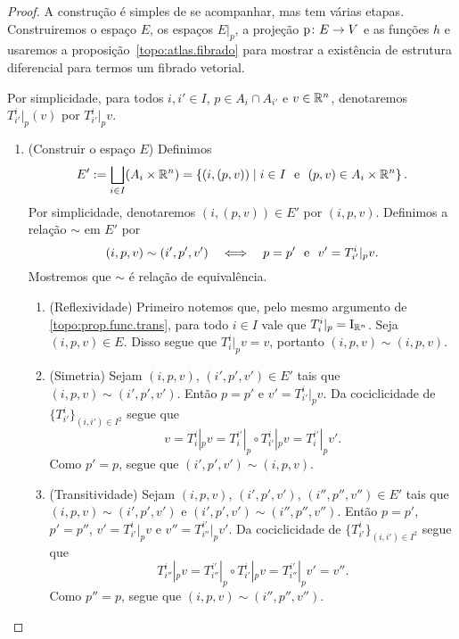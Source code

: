 \begin{proof}
A construção é simples de se acompanhar, mas tem várias etapas. Construiremos o espaço $E$, os espaços $E|_p$, a projeção $\mathrm{p}\colon E \to V$ e as funções $h$ e usaremos a proposição~\ref{topo:atlas.fibrado} para mostrar a existência de estrutura diferencial para termos um fibrado vetorial.

Por simplicidade, para todos $i,i' \in I$, $p \in A_i \cap A_{i'}$ e $v \in \mathbb{R}^n$, denotaremos $T^i_{i'}|_p (v)$ por $T^i_{i'}|_p v$.
\begin{enumerate}
\item (Construir o espaço $E$) Definimos
	\begin{equation*}
	E' := \bigsqcup_{i \in I} (A_i \times \mathbb{R}^n) = \left\{{(i,(p,v))}\;\middle\vert\;{i \in I \text{\ \ e\ \ } (p,v) \in A_i \times \mathbb{R}^n}\right\}.
	\end{equation*}
Por simplicidade, denotaremos $(i,(p,v)) \in E'$ por $(i,p,v)$. Definimos a relação $\sim$ em $E'$ por
	\begin{equation*}
	(i,p,v) \sim (i',p',v') \quad \Longleftrightarrow \quad p=p' \text{\ \ e\ \ } v'=T^i_{i'}|_p v.
	\end{equation*}
Mostremos que $\sim$ é relação de equivalência.

	\begin{enumerate}
	\item (Reflexividade) Primeiro notemos que, pelo mesmo argumento de \ref{topo:prop.func.trans}, para todo $i \in I$ vale que $T^i_i|_p = \mathrm{I}_{\mathbb{R}^n}$. Seja $(i,p,v) \in E$. %
Disso segue que $T^i_i|_p v = v$, portanto $(i,p,v) \sim (i,p,v)$.

	\item (Simetria) Sejam $(i,p,v)$, $(i',p',v') \in E'$ tais que $(i,p,v) \sim (i',p',v')$. Então $p=p'$ e $v'=T^i_{i'}|_p v$. Da %
cociclicidade de $\{T^i_{i'}\}_{(i,i') \in I^2}$ segue que
	\begin{equation*}
	v = T^i_i|_p v = T^{i'}_i|_p \circ T^i_{i'}|_p v = T^{i'}_i|_p v'.
	\end{equation*}
Como $p'=p$, segue que $(i',p',v') \sim (i,p,v)$.

	\item (Transitividade) Sejam $(i,p,v)$, $(i',p',v')$, $(i'',p'',v'') \in E'$ tais que $(i,p,v) \sim (i',p',v')$ e $(i',p',v') \sim (i'',p'',v'')$. Então $p=p'$, $p'=p''$, $v'=T^i_{i'}|_p v$ e $v''=T^{i'}_{i''}|_p v'$. Da cociclicidade de $\{T^i_{i'}\}_{(i,i') \in I^2}$ segue que
	\begin{equation*}
	T^i_{i''}|_p v = T^{i'}_{i''}|_p \circ T^i_{i'}|_p v = T^{i'}_{i''}|_p v' = v''.
	\end{equation*}
Como $p''=p$, segue que $(i,p,v) \sim (i'',p'',v'')$.
	\end{enumerate}


\end{enumerate}
\end{proof}

